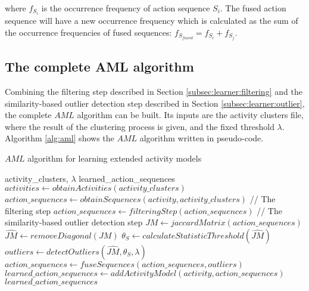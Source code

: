 \noindent where $f_{S_i}$ is the occurrence frequency of action sequence $S_i$. The fused action sequence will have a new occurrence frequency which is calculated as the sum of the occurrence frequencies of fused sequences: $f_{S_{fused}} = f_{S_i} + f_{S_j}$. 

\subsection{The complete AML algorithm}
\label{subsec:learner:complete}

Combining the filtering step described in Section \ref{subsec:learner:filtering} and the similarity-based outlier detection step described in Section \ref{subsec:learner:outlier}, the complete $AML$ algorithm can be built. Its inputs are the activity clusters file, where the result of the clustering process is given, and the fixed threshold $\lambda$. Algorithm \ref{alg:aml} shows the $AML$ algorithm written in pseudo-code.  

\begin{algorithm}
 \caption{$AML$ algorithm for learning extended activity models}
 \label{alg:aml}
 \begin{algorithmic}
 \REQUIRE activity\_clusters, $\lambda$
 \ENSURE learned\_action\_sequences
 \STATE $activities \leftarrow obtainActivities(activity\_clusters)$
   \STATE $action\_sequences \leftarrow obtainSequences(activity, activity\_clusters)$
   \STATE // The filtering step
   \STATE $action\_sequences \leftarrow filteringStep(action\_sequences)$
   \STATE // The similarity-based outlier detection step
   \REPEAT
     \STATE $JM \leftarrow jaccardMatrix(action\_sequences)$
     \STATE $\hat{JM} \leftarrow removeDiagonal(JM)$
     \STATE $\theta_S \leftarrow calculateStatisticThreshold(\hat{JM})$
     \STATE $outliers \leftarrow detectOutliers(\hat{JM}, \theta_S, \lambda)$
     \STATE $action\_sequences \leftarrow fuseSequences(action\_sequences, outliers)$
   \STATE $learned\_action\_sequences \leftarrow addActivityModel(activity, action\_sequences)$
 \ENDFOR
 \RETURN $learned\_action\_sequences$ 
 \end{algorithmic}
\end{algorithm}

